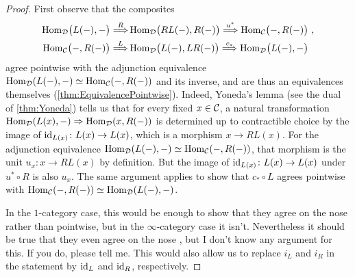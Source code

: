 \begin{proof}
	First observe that the composites
	\begin{align*}
		\Hom_\Dd\lef(L(-),-\righ)\overset{R}{\Longrightarrow}&\Hom_\Dd\lef(RL(-),R(-)\righ)\overset{u^*}{\Longrightarrow}\Hom_\Cc\lef(-,R(-)\righ)\,,\\
		\Hom_\Cc\lef(-,R(-)\righ)\overset{L}{\Longrightarrow}&\Hom_\Dd\lef(L(-),LR(-)\righ)\overset{c_*}{\Longrightarrow}\Hom_\Dd\lef(L(-),-\righ)
	\end{align*}
	agree pointwise with the adjunction equivalence $\operatorname{Hom}_{\mathcal{D}}(L(-),-)\simeq \operatorname{Hom}_{\mathcal{C}}(-,R(-))$ and its inverse, and are thus an equivalences themselves (\cref{thm:EquivalencePointwise}). Indeed, Yoneda's lemma (see the dual of \cref{thm:Yoneda}) tells us that for every fixed $x\in\mathcal{C}$, a natural transformation $\operatorname{Hom}_{\mathcal{D}}(L(x),-)\Rightarrow \operatorname{Hom}_{\mathcal{D}}(x,R(-))$ is determined up to contractible choice by the image of $\operatorname{id}_{L(x)}\colon L(x)\rightarrow L(x)$, which is a morphism $x\rightarrow RL(x)$. For the adjunction equivalence $\operatorname{Hom}_{\mathcal{D}}(L(-),-)\simeq \operatorname{Hom}_{\mathcal{C}}(-,R(-))$, that morphism is the unit $u_x\colon x\rightarrow RL(x)$ by definition. But the image of $\operatorname{id}_{L(x)}\colon L(x)\rightarrow L(x)$ under $u^*\circ R$ is also $u_x$. The same argument applies to show that $c_*\circ L$ agrees pointwise with $\operatorname{Hom}_{\mathcal{C}}(-,R(-))\simeq \operatorname{Hom}_{\mathcal{D}}(L(-),-)$.
	
	In the $1$-category case, this would be enough to show that they agree on the nose rather than pointwise, but in the $\infty$-category case it isn't. Nevertheless it should be true that they even agree on the nose , but I don't know any argument for this. If you do, please tell me. This would also allow us to replace $i_L$ and $i_R$ in the statement by $\operatorname{id}_L$ and $\operatorname{id}_R$, respectively.
	

\end{proof}
